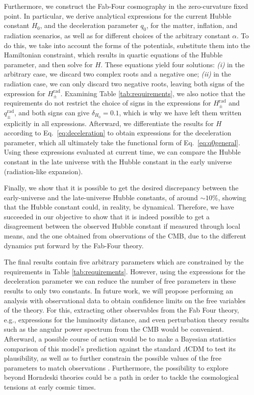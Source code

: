 \documentclass[onecolumn,superscriptaddress,secnumarabic,amssymb,amsmath,nobibnotes,aps,prd,nofootinbib,altaffilletter]{revtex4}
\begin{document}
Furthermore, we construct the Fab-Four cosmography in the zero-curvature fixed point. In particular, we derive analytical expressions for the current Hubble constant $H_0$, and the deceleration parameter $q_0$, for the matter, inflation, and radiation scenarios, as well as for different choices of the arbitrary constant $\alpha$. To do this, we take into account the forms of the potentials, substitute them into the Hamiltonian constraint, which results in quartic equations of the Hubble parameter, and then solve for $H$. These equations yield four solutions: \textit{(i)} in the arbitrary case, we discard two complex roots and a negative one; \textit{(ii)} in the radiation case, we can only discard two negative roots, leaving both signs of the expression for $H^{\text{rad}}_\pm$. Examining Table \ref{tab:requirements}, we also notice that the requirements do not restrict the choice of signs in the expressions for $H^{\text{rad}}_\pm$ and $q^{\text{rad}}_\pm$, and both signs can give $\delta_{H_0}=0.1$,  which is why we have left them written explicitly in all expressions.
Afterward, we differentiate the results for $H$ according to Eq.~\eqref{eq:deceleration} to obtain expressions for the deceleration parameter, which all ultimately take the functional form of Eq.~\eqref{eq:q0general}.  Using these expressions evaluated at current time, we can compare the Hubble constant in the late universe with the Hubble constant in the early universe (radiation-like expansion). 

Finally, we show that it is possible to get the desired discrepancy between the early-universe and the late-universe Hubble constants, of around $\sim 10$\%, showing that the Hubble constant could, in reality, be dynamical. Therefore, we have succeeded in our objective to show that it is indeed possible to get a disagreement between the observed Hubble constant if measured through local means, and the one obtained from observations of the CMB, due to the different dynamics put forward by the Fab-Four theory.

The final results contain five arbitrary parameters which are constrained by the requirements in Table \ref{tab:requirements}. However, using the expressions for the deceleration parameter we can reduce the number of free parameters in these results to only two constants. In future work, we will propose performing an analysis with observational data to obtain confidence limits on the free variables of the theory. For this, extracting other observables from the Fab Four theory, e.g., expressions for the luminosity distance, and even perturbation theory results such as the angular power spectrum from the CMB would be convenient.  Afterward, a possible course of action would be to make a Bayesian statistics comparison of this model's prediction against the standard $\Lambda$CDM to test its plausibility, as well as to further constrain the possible values of the free parameters to match observations \cite{escamilla2023}. Furthermore, the possibility to explore beyond Horndeski theories \cite{Kobayashi:2019hrl} could be a path in order to tackle the cosmological tensions at early cosmic times. 
\end{document}
